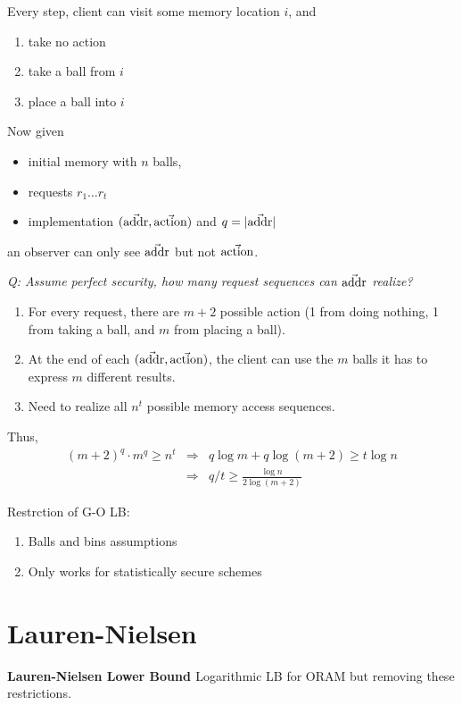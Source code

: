 \noindent Every step, client can visit some memory location $i$, and
\begin{enumerate}
  \item take no action
  \item take a ball from $i$
  \item place a ball into $i$
\end{enumerate}

\noindent Now given
\begin{itemize}
  \item initial memory with $n$ balls,
  \item requests $r_1\dots r_t$
  \item implementation $(\vec{\mbox{addr}}, \vec{\mbox{action}})$ and $q = |\vec{\mbox{addr}}|$
\end{itemize}
an observer can only see $\vec{\mbox{addr}}$ but not $\vec{\mbox{action}}$.

\bigskip
\noindent\emph{Q: Assume perfect security, how many request sequences can $\vec{\mbox{addr}}$ realize?}
\begin{enumerate}
  \item For every request, there are $m+2$ possible action (1 from doing nothing, 1 from taking a ball, and $m$ from placing a ball).
  \item At the end of each $(\vec{\mbox{addr}}, \vec{\mbox{action}})$, the client can use the $m$ balls it has to express $m$ different results.
  \item Need to realize all $n^t$ possible memory access sequences.
\end{enumerate}
Thus,
$$
\begin{array}{rcl}
  (m+2)^q \cdot m^q \geq n^t & \Rightarrow & q\log m + q\log(m+2) \geq t\log n \\
  & \Rightarrow & q/t \geq \frac{\log n}{2\log (m+2)}
\end{array}
$$

\noindent Restrction of G-O LB:
\begin{enumerate}
  \item Balls and bins assumptions
  \item Only works for statistically secure schemes
\end{enumerate}

\section{Lauren-Nielsen}

\textbf{Lauren-Nielsen Lower Bound \cite{larsen18lowerbound}} Logarithmic LB for ORAM but removing these restrictions.

